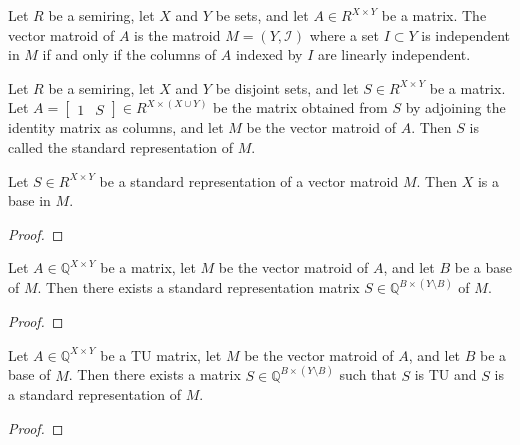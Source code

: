 \begin{definition}\label{def:vector_matroid_full_repr}
    Let $R$ be a semiring, let $X$ and $Y$ be sets, and let $A \in R^{X \times Y}$ be a matrix. The vector matroid of $A$ is the matroid $M = (Y, \mathcal{I})$ where a set $I \subset Y$ is independent in $M$ if and only if the columns of $A$ indexed by $I$ are linearly independent.
\end{definition}

\begin{definition}\label{def:vector_matroid_std_repr}
    Let $R$ be a semiring, let $X$ and $Y$ be disjoint sets, and let $S \in R^{X \times Y}$ be a matrix. Let $A = \begin{bmatrix} 1 & S \end{bmatrix} \in R^{X \times (X \cup Y)}$ be the matrix obtained from $S$ by adjoining the identity matrix as columns, and let $M$ be the vector matroid of $A$. Then $S$ is called the standard representation of $M$.
\end{definition}

\begin{lemma}\label{lem:std_repr_rows_base}
    Let $S \in R^{X \times Y}$ be a standard representation of a vector matroid $M$. Then $X$ is a base in $M$.
\end{lemma}

\begin{proof}
    \SeeLean
\end{proof}

\begin{lemma}\label{lem:repr_to_std_repr}
    Let $A \in \mathbb{Q}^{X \times Y}$ be a matrix, let $M$ be the vector matroid of $A$, and let $B$ be a base of $M$. Then there exists a standard representation matrix $S \in \mathbb{Q}^{B \times (Y \setminus B)}$ of $M$.
\end{lemma}

\begin{proof}
    \SeeLean
\end{proof}

\begin{lemma}\label{lem:TU_repr_to_TU_std_repr}
    Let $A \in \mathbb{Q}^{X \times Y}$ be a TU matrix, let $M$ be the vector matroid of $A$, and let $B$ be a base of $M$. Then there exists a matrix $S \in \mathbb{Q}^{B \times (Y \setminus B)}$ such that $S$ is TU and $S$ is a standard representation of $M$.
\end{lemma}

\begin{proof}
    \SeeLean
\end{proof}

